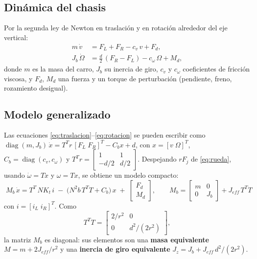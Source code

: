 \documentclass[11pt,letterpaper]{article}
\begin{document}
\subsection{Dinámica del chasis}
Por la segunda ley de Newton en traslación y en rotación alrededor del eje vertical:
\begin{align}
  m\,\dot v &= F_L + F_R - c_v\, v + F_d, \label{eq:traslacion}\\
  J_b\,\dot\Omega &= \frac{d}{2}\,(F_R - F_L) - c_\omega\, \Omega + M_d, \label{eq:rotacion}
\end{align}
donde $m$ es la masa del carro, $J_b$ su inercia de giro, $c_v$ y $c_\omega$ coeficientes de fricción viscosa, y $F_d$, $M_d$ una fuerza y un torque de perturbación (pendiente, freno, rozamiento desigual).

\subsection{Modelo generalizado}
Las ecuaciones \eqref{eq:traslacion}--\eqref{eq:rotacion} se pueden escribir como $\operatorname{diag}(m,J_b)\,\dot x = T^T r\,[F_L\;F_R]^T - C_b x + d$, con $x=[v\;\Omega]^T$, $C_b=\operatorname{diag}(c_v,c_\omega)$ y $T^T r = \begin{bmatrix} 1 & 1\\ -d/2 & d/2\end{bmatrix}$. Despejando $rF_j$ de \eqref{eq:rueda}, usando $\dot\omega = T\dot x$ y $\omega = Tx$, se obtiene un modelo compacto:
\begin{equation}
  \boxed{\;M_b\,\dot x = T^T\,N K_t\, i \;-\; \big(N^2 b\, T^T T + C_b\big)\,x \;+\; \begin{bmatrix} F_d\\ M_d\end{bmatrix},
  \qquad M_b = \begin{bmatrix} m & 0 \\ 0 & J_b \end{bmatrix} + J_{eff}\,T^T T\;}
  \label{eq:generalizado}
\end{equation}
con $i = [i_L\;i_R]^T$. Como
\begin{equation}
  T^T T = \begin{bmatrix} 2/r^2 & 0 \\ 0 & d^2/(2r^2) \end{bmatrix},
\end{equation}
la matriz $M_b$ es diagonal: sus elementos son una \textbf{masa equivalente} $M = m + 2J_{eff}/r^2$ y una \textbf{inercia de giro equivalente} $J_z = J_b + J_{eff}\,d^2/(2r^2)$.
\end{document}
